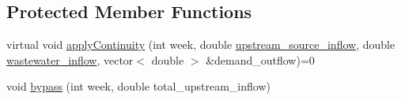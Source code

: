 \subsection*{Protected Member Functions}
\begin{DoxyCompactItemize}
\item 
virtual void \mbox{\hyperlink{classWaterSource_ac070445379fe706f65b977dade4f3fbc}{apply\+Continuity}} (int week, double \mbox{\hyperlink{classWaterSource_a7a69b2e9b6030f1035e6cf44d2918ee5}{upstream\+\_\+source\+\_\+inflow}}, double \mbox{\hyperlink{classWaterSource_aeb5a2d2d83383a70ca20f3e94635a9c7}{wastewater\+\_\+inflow}}, vector$<$ double $>$ \&demand\+\_\+outflow)=0
\item 
void \mbox{\hyperlink{classWaterSource_abeb8ba4b51c2b270baf9162df76d8b58}{bypass}} (int week, double total\+\_\+upstream\+\_\+inflow)
\end{DoxyCompactItemize}

